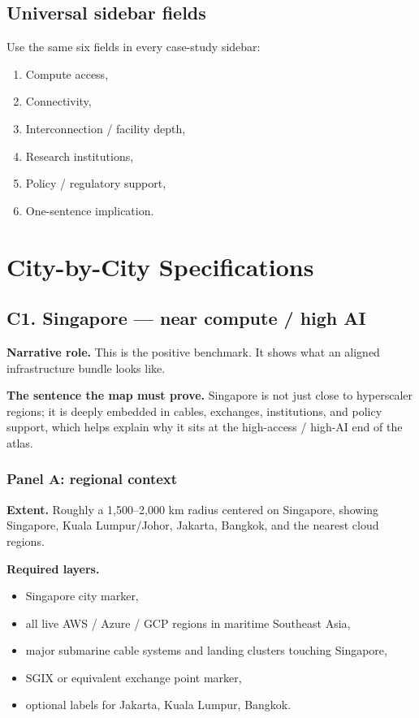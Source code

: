 \documentclass[11pt]{article}
\begin{document}
\subsection{Universal sidebar fields}
Use the same six fields in every case-study sidebar:
\begin{enumerate}[leftmargin=1.4em,itemsep=0.2em]
    \item Compute access,
    \item Connectivity,
    \item Interconnection / facility depth,
    \item Research institutions,
    \item Policy / regulatory support,
    \item One-sentence implication.
\end{enumerate}

\section{City-by-City Specifications}

\subsection{C1. Singapore --- near compute / high AI}

\textbf{Narrative role.} This is the positive benchmark. It shows what an aligned infrastructure bundle looks like.

\textbf{The sentence the map must prove.} Singapore is not just close to hyperscaler regions; it is deeply embedded in cables, exchanges, institutions, and policy support, which helps explain why it sits at the high-access / high-AI end of the atlas.

\subsubsection*{Panel A: regional context}
\textbf{Extent.} Roughly a 1{,}500--2{,}000 km radius centered on Singapore, showing Singapore, Kuala Lumpur/Johor, Jakarta, Bangkok, and the nearest cloud regions.

\textbf{Required layers.}
\begin{itemize}[leftmargin=1.4em,itemsep=0.18em]
    \item Singapore city marker,
    \item all live AWS / Azure / GCP regions in maritime Southeast Asia,
    \item major submarine cable systems and landing clusters touching Singapore,
    \item SGIX or equivalent exchange point marker,
    \item optional labels for Jakarta, Kuala Lumpur, Bangkok.
\end{itemize}
\end{document}
